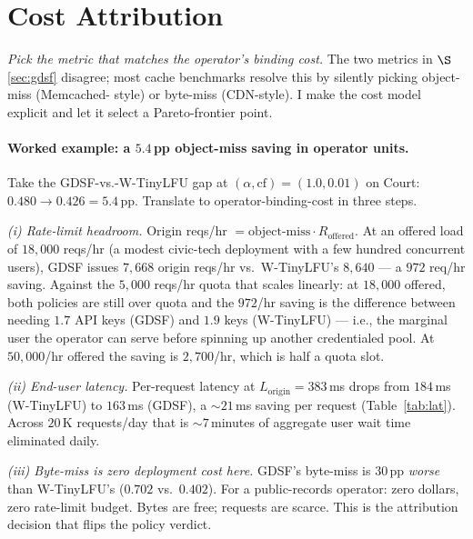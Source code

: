 \documentclass[letterpaper,twocolumn,10pt]{article}
\begin{document}
\section{Cost Attribution}\label{sec:weighted}

\noindent \emph{Pick the metric that matches the operator's binding
cost.} The two metrics in $\S$\ref{sec:gdsf} disagree; most cache
benchmarks resolve this by silently picking object-miss (Memcached-
style) or byte-miss (CDN-style). I make the cost model explicit and
let it select a Pareto-frontier point.

\paragraph{Worked example: a $5.4$\,pp object-miss saving in operator
units.} Take the GDSF-vs.-W-TinyLFU gap at $(\alpha, \text{cf}) =
(1.0, 0.01)$ on Court: $0.480 \to 0.426 = 5.4$\,pp. Translate to
operator-binding-cost in three steps.

\textit{(i) Rate-limit headroom.} Origin reqs/hr $=
\text{object-miss} \cdot R_{\text{offered}}$. At an offered load of
$18{,}000$ reqs/hr (a modest civic-tech deployment with a few hundred
concurrent users), GDSF issues $7{,}668$ origin reqs/hr vs.\
W-TinyLFU's $8{,}640$ — a $972$ req/hr saving. Against the
$5{,}000$ reqs/hr quota that scales linearly: at $18{,}000$ offered,
both policies are still over quota and the $972$/hr saving is the
difference between needing $1.7$ API keys (GDSF) and $1.9$ keys
(W-TinyLFU) — i.e., the marginal user the operator can serve before
spinning up another credentialed pool. At $50{,}000$/hr offered the
saving is $2{,}700$/hr, which is half a quota slot.

\textit{(ii) End-user latency.} Per-request latency at
$L_{\text{origin}} = 383$\,ms drops from $184$\,ms (W-TinyLFU) to
$163$\,ms (GDSF), a $\sim 21$\,ms saving per request
(Table~\ref{tab:lat}). Across $20$\,K requests/day that is
$\sim 7$\,minutes of aggregate user wait time eliminated daily.

\textit{(iii) Byte-miss is zero deployment cost here.} GDSF's
byte-miss is $30$\,pp \emph{worse} than W-TinyLFU's ($0.702$ vs.\
$0.402$). For a public-records operator: zero dollars, zero
rate-limit budget. Bytes are free; requests are scarce. This is the
attribution decision that flips the policy verdict.
\end{document}
